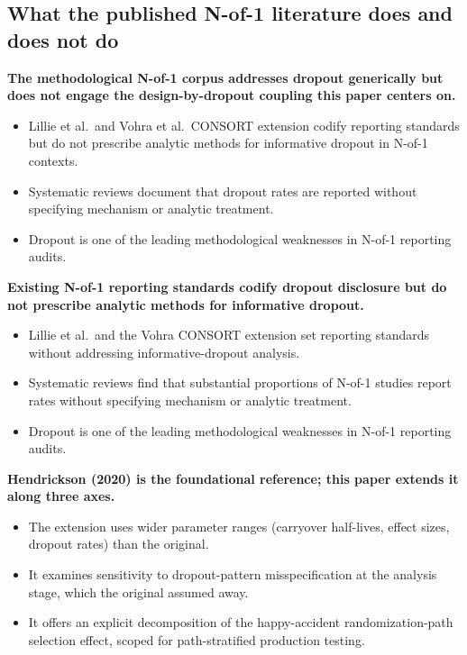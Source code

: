 \documentclass[
  11pt,
]{article}
\begin{document}
\subsection{What the published N-of-1 literature does and does not do}\label{what-the-published-n-of-1-literature-does-and-does-not-do}

\textbf{The methodological N-of-1 corpus addresses dropout generically but does not engage the design-by-dropout coupling this paper centers on.}

\begin{itemize}\setlength{\itemsep}{2pt}\setlength{\parskip}{0pt}
\item Lillie et al.\ and Vohra et al.\ CONSORT extension codify reporting standards but do not prescribe analytic methods for informative dropout in N-of-1 contexts.
\item Systematic reviews document that dropout rates are reported without specifying mechanism or analytic treatment.
\item Dropout is one of the leading methodological weaknesses in N-of-1 reporting audits.
\end{itemize}

\textbf{Existing N-of-1 reporting standards codify dropout disclosure but do not prescribe analytic methods for informative dropout.}

\begin{itemize}\setlength{\itemsep}{2pt}\setlength{\parskip}{0pt}
\item Lillie et al.\ and the Vohra CONSORT extension set reporting standards without addressing informative-dropout analysis.
\item Systematic reviews find that substantial proportions of N-of-1 studies report rates without specifying mechanism or analytic treatment.
\item Dropout is one of the leading methodological weaknesses in N-of-1 reporting audits.
\end{itemize}

\textbf{Hendrickson (2020) is the foundational reference; this paper extends it along three axes.}

\begin{itemize}\setlength{\itemsep}{2pt}\setlength{\parskip}{0pt}
\item The extension uses wider parameter ranges (carryover half-lives, effect sizes, dropout rates) than the original.
\item It examines sensitivity to dropout-pattern misspecification at the analysis stage, which the original assumed away.
\item It offers an explicit decomposition of the happy-accident randomization-path selection effect, scoped for path-stratified production testing.
\end{itemize}
\end{document}
